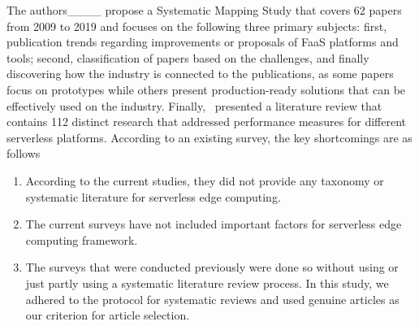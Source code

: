 The authors____ propose a Systematic Mapping Study that covers 62 papers from 2009 to 2019 and focuses on the following three primary subjects: first, publication trends regarding improvements or proposals of FaaS platforms and tools; second, classification of papers based on the challenges, and finally discovering how the industry is connected to the publications, as some papers focus on prototypes while others present production-ready solutions that can be effectively used on the industry. Finally,~\cite {scheuner2020function-27} presented a literature review that contains 112 distinct research that addressed performance measures for different serverless platforms.
 According to an  existing survey, the key shortcomings are  as follows
 \begin{enumerate}
     \item  According to the current studies, they did not provide any taxonomy or systematic literature for serverless edge computing.
     \item The current surveys have not included important factors for serverless edge computing framework.
     \item The surveys that were conducted previously were done so without using or just partly using a systematic literature review process. In this study, we adhered to the protocol for systematic reviews and used genuine articles as our criterion for article selection.
 \end{enumerate}